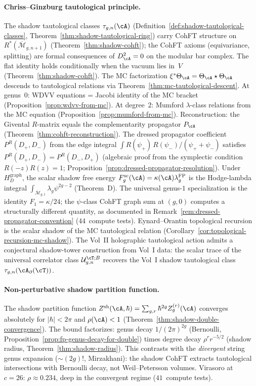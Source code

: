 \paragraph{Chriss--Ginzburg tautological principle.}
The shadow tautological classes $\tau_{g,n}(\cA)$
(Definition~\ref{def:shadow-tautological-classes},
Theorem~\ref{thm:shadow-tautological-ring})
carry CohFT structure on
$R^*(\overline{\mathcal{M}}_{g,n+1})$
(Theorem~\ref{thm:shadow-cohft});
the CohFT axioms (equivariance, splitting) are formal consequences of $D_\cA^2 = 0$ on the modular bar complex. The flat identity holds conditionally when the vacuum lies in~$V$ (Theorem~\ref{thm:shadow-cohft}).
The MC factorization
$\xi^*\Theta_\cA = \Theta_\cA \star \Theta_\cA$
descends to tautological relations via
Theorem~\ref{thm:mc-tautological-descent}.
At genus~$0$: WDVV equations = Jacobi identity of the MC bracket
(Proposition~\ref{prop:wdvv-from-mc}).
At degree~$2$: Mumford $\lambda$-class relations from the MC equation
(Proposition~\ref{prop:mumford-from-mc}).
Reconstruction:
the Givental $R$-matrix equals the complementarity propagator
$P_\cA$
(Theorem~\ref{thm:cohft-reconstruction}).
The dressed propagator coefficient
$P^R(D_+,D_-)$ from the edge integral
$\int R(\psi_+)\,R(\psi_-)/(\psi_+ + \psi_-)$
satisfies $P^R(D_+,D_-)=P^R(D_-,D_+)$
(algebraic proof from the symplectic condition
$R(-z)R(z)=1$;
Proposition~\ref{prop:dressed-propagator-resolution}).
Under~$H_D^{\mathrm{graph}}$, the scalar shadow free energy
$F_g^{\mathrm{sc}}(\cA)=\kappa(\cA)\lambda_g^{\mathrm{FP}}$
is the Hodge-lambda integral
$\int_{\overline{\mathcal{M}}_{g,1}}\lambda_g\psi^{2g-2}$
(Theorem~D). The universal genus-$1$ specialization is the identity
$F_1 = \kappa/24$;
the $\psi$-class CohFT graph sum at $(g,0)$
computes a structurally different quantity,
as documented in
Remark~\ref{rem:dressed-propagator-convention}
($44$~compute tests).
Eynard--Orantin topological recursion is the scalar shadow
of the MC tautological relation
(Corollary~\ref{cor:topological-recursion-mc-shadow}).
The Vol~II holographic tautological action
admits a conjectural shadow-tower construction from Vol~I data:
the scalar trace of the universal correlator class
$\mathcal{U}_{g,n}^{\cT;B}$ recovers the Vol~I shadow
tautological class $\tau_{g,n}(\cA_\partial(\cT))$.

\paragraph{Non-perturbative shadow partition function.}
The shadow partition function
$Z^{\mathrm{sh}}(\cA,\hbar) = \sum_{g,r}\hbar^{2g}Z_g^{(r)}(\cA)$
converges absolutely for $|\hbar|<2\pi$ and $\rho(\cA)<1$
(Theorem~\ref{thm:shadow-double-convergence}).
The bound factorizes: genus decay
$1/(2\pi)^{2g}$ (Bernoulli, Proposition~\ref{prop:fp-genus-decay-for-double})
times degree decay $\rho^r r^{-5/2}$ (shadow radius,
Theorem~\ref{thm:shadow-radius}).
This contrasts with the \emph{divergent}
string genus expansion ($\sim(2g)!$, Mirzakhani):
the shadow CohFT extracts tautological intersections with
Bernoulli decay, not Weil--Petersson volumes.
Virasoro at $c=26$: $\rho\approx 0.234$, deep in the convergent
regime ($41$~compute tests).

